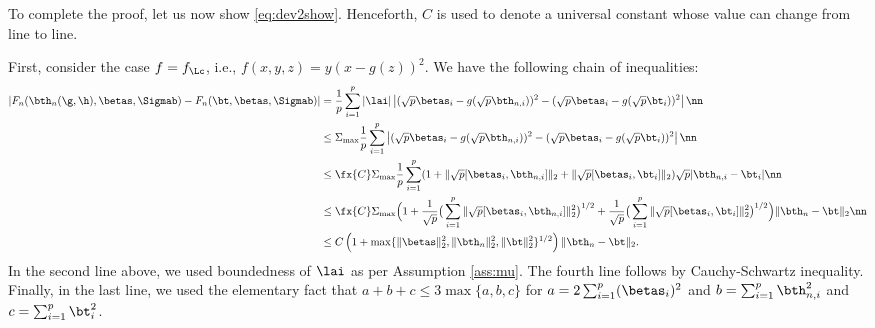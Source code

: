 \vp
\noindent{} To complete the proof, let us now show \eqref{eq:dev2show}. Henceforth, $C$ is used to denote a universal constant whose value can change from line to line.

 First, consider the case $f=f_\Lc$, i.e., $f(x,y,z) = y(x-g(z))^2$. We have the following chain of inequalities:
\begin{align}
|F_n(\bth_n(\g,\h),\betas,\Sigmab) - F_n(\bt,\betas,\Sigmab)| &=
 \frac{1}{p}\sum_{i=1}^p|\lai|\left| (\sqrt{p}\betas_i-g(\sqrt{p}\bth_{n,i}))^2-(\sqrt{p}\betas_i-g(\sqrt{p}\bt_{i}))^2 \right|\nn\\
 &\leq
\Sigma_{\max} \frac{1}{p}\sum_{i=1}^p \left| (\sqrt{p}\betas_i-g(\sqrt{p}\bth_{n,i}))^2-(\sqrt{p}\betas_i-g(\sqrt{p}\bt_{i}))^2 \right|\nn\\
 &\leq
\fx{C} \Sigma_{\max} \frac{1}{p}\sum_{i=1}^p (1+ \|\sqrt{p}[\betas_i,\bth_{n,i}]\|_2 +  \|\sqrt{p}[\betas_i,\bt_{i}]\|_2) \sqrt{p}|\bth_{n,i}-\bt_{i}|\nn\\
 &\leq
\fx{C} \Sigma_{\max}  \Big(1+ \frac{1}{\sqrt{p}}\big(\sum_{i=1}^{p}\|\sqrt{p}[\betas_i,\bth_{n,i}]\|_2^2\big)^{1/2} + \frac{1}{\sqrt{p}}\big(\sum_{i=1}^p\|\sqrt{p}[\betas_i,\bt_{i}]\|_2^2\big)^{1/2}\Big) \|\bth_n-\bt\|_2\nn\\
 &\leq
C  \left(1+ \max\{\|\betas\|_2^2,\|\bth_n\|_2^2,\|\bt\|_2^2\}^{1/2} \right) \|\bth_n-\bt\|_2.\label{eq:fcase1}
 \end{align}
 In the second line above, we used boundedness of $\lai$ as per Assumption \ref{ass:mu}.  The fourth line follows by Cauchy-Schwartz  inequality. Finally, in the last line, we used the elementary fact that $a+b+c\leq 3\max\{a,b,c\}$ for $a=2\sum_{i=1}^p(\betas_i)^2$ and $b=\sum_{i=1}^p\bth_{n,i}^2$ and $c=\sum_{i=1}^p\bt_{i}^2$.
 
